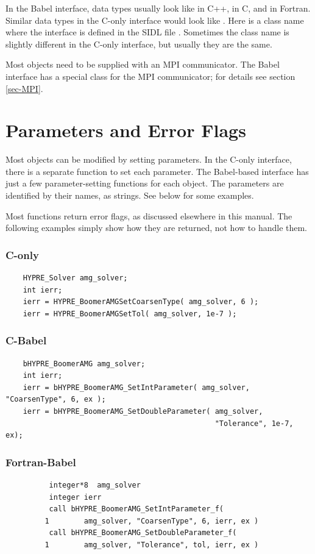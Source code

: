 In the Babel interface, data types usually look like  in
C++,  in C, and  in Fortran.  Similar
data types in the C-only interface would look like
.  Here  is a class name where the
interface is defined in the SIDL file .
Sometimes the class name is slightly different in the C-only
interface, but usually they are the same.

Most \hypre{} objects need to be supplied with an MPI communicator.
The Babel interface has a special class for the MPI communicator; for
details see section \ref{sec-MPI}.

\section{Parameters and Error Flags}
\label{sec-Parameters-ErrorFlags}

Most \hypre{} objects can be modified by setting parameters.  In the
C-only interface, there is a separate function to set each parameter.
The Babel-based interface has just a few parameter-setting functions
for each object.  The parameters are identified by their names, as
strings.  See below for some examples.

Most \hypre{} functions return error flags, as discussed elsewhere in
this manual. The following examples simply show how they are returned,
not how to handle them.

\subsubsection{C-only}
\begin{verbatim}
    HYPRE_Solver amg_solver;
    int ierr;
    ierr = HYPRE_BoomerAMGSetCoarsenType( amg_solver, 6 );
    ierr = HYPRE_BoomerAMGSetTol( amg_solver, 1e-7 );
\end{verbatim}

\subsubsection{C-Babel}
\begin{verbatim}
    bHYPRE_BoomerAMG amg_solver;
    int ierr;
    ierr = bHYPRE_BoomerAMG_SetIntParameter( amg_solver, "CoarsenType", 6, ex );
    ierr = bHYPRE_BoomerAMG_SetDoubleParameter( amg_solver,
                                                "Tolerance", 1e-7, ex);
\end{verbatim}

\subsubsection{Fortran-Babel}
\begin{verbatim}
          integer*8  amg_solver
          integer ierr
          call bHYPRE_BoomerAMG_SetIntParameter_f(
         1        amg_solver, "CoarsenType", 6, ierr, ex )
          call bHYPRE_BoomerAMG_SetDoubleParameter_f(
         1        amg_solver, "Tolerance", tol, ierr, ex )
\end{verbatim}

